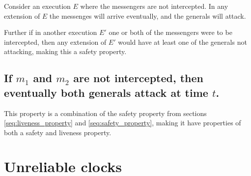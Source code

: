 \documentclass[a4paper]{scrreprt}
\begin{document}
Consider an execution $E$ where the messengers are not intercepted. In any
extension of $E$ the messenges will arrive eventually, and the generals will
attack.

Further if in another execution $E'$ one or both of the messengers were to be
intercepted, then any extension of $E'$ would have at least one of the generals
not attacking, making this a safety property.

\subsection{If $m_1$ and $m_2$ are not intercepted, then eventually both generals attack at time $t$.}

This property is a combination of the safety property from sections
\ref{seq:liveness_property} and \ref{seq:safety_property}, making it have
properties of both a safety and liveness property.

\section{Unreliable clocks}
\end{document}
